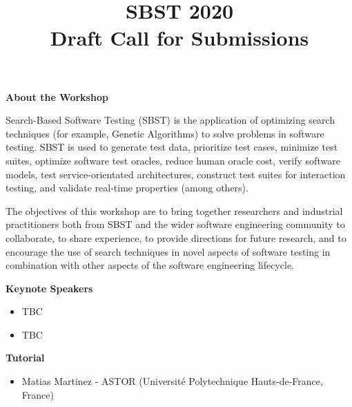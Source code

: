 \documentclass[10pt,conference]{IEEEtran}
\title{SBST 2020\\Draft Call for Submissions}
\begin{document}
\maketitle






\noindent\textbf{About the Workshop}



\smallskip\noindent Search-Based Software Testing (SBST) is the
application of optimizing search techniques (for example, Genetic
Algorithms) to solve problems in software testing. SBST is used to
generate test data, prioritize test cases, minimize test suites,
optimize software test oracles, reduce human oracle cost, verify
software models, test service-orientated architectures, construct test
suites for interaction testing, and validate real-time properties
(among others).

\smallskip\noindent The objectives of this workshop are to bring
together researchers and industrial practitioners both from SBST and
the wider software engineering community to collaborate, to share
experience, to provide directions for future research, and to
encourage the use of search techniques in novel aspects of software
testing in combination with other aspects of the software engineering
lifecycle.





\smallskip\noindent\textbf{Keynote Speakers}
\begin{itemize}
\setlength{\itemsep}{1pt}
  \setlength{\parskip}{0pt}
  \setlength{\parsep}{0pt}
\item{TBC}
\item{TBC}
\end{itemize}

\smallskip\noindent\textbf{Tutorial}
\begin{itemize}
\setlength{\itemsep}{1pt}
  \setlength{\parskip}{0pt}
  \setlength{\parsep}{0pt}
\item{Matias Martinez - ASTOR\newline
(Universit{\'e} Polytechnique Hauts-de-France, France)}
\end{itemize}
\end{document}
